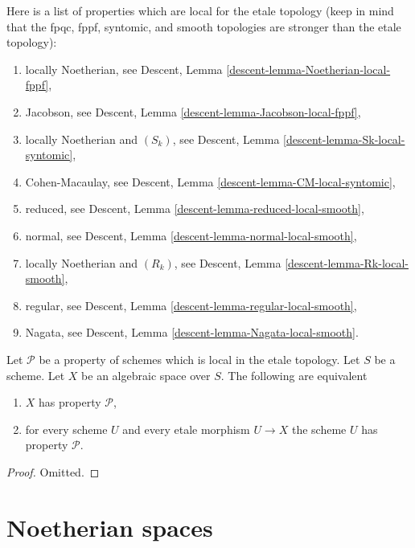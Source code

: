 \begin{remark}
\label{remark-list-properties-local-etale-topology}
Here is a list of properties which are local for the etale topology
(keep in mind that the fpqc, fppf, syntomic, and smooth topologies are
stronger than the etale topology):
\begin{enumerate}
\item locally Noetherian, see
Descent, Lemma \ref{descent-lemma-Noetherian-local-fppf},
\item Jacobson, see
Descent, Lemma \ref{descent-lemma-Jacobson-local-fppf},
\item locally Noetherian and $(S_k)$, see
Descent, Lemma \ref{descent-lemma-Sk-local-syntomic},
\item Cohen-Macaulay, see
Descent, Lemma \ref{descent-lemma-CM-local-syntomic},
\item reduced, see
Descent, Lemma \ref{descent-lemma-reduced-local-smooth},
\item normal, see
Descent, Lemma \ref{descent-lemma-normal-local-smooth},
\item locally Noetherian and $(R_k)$, see
Descent, Lemma \ref{descent-lemma-Rk-local-smooth},
\item regular, see
Descent, Lemma \ref{descent-lemma-regular-local-smooth},
\item Nagata, see
Descent, Lemma \ref{descent-lemma-Nagata-local-smooth}.
\end{enumerate}
\end{remark}

\begin{lemma}
\label{lemma-type-property}
Let $\mathcal{P}$ be a property of schemes which is 
local in the etale topology.
Let $S$ be a scheme.
Let $X$ be an algebraic space over $S$.
The following are equivalent
\begin{enumerate}
\item $X$ has property $\mathcal{P}$,
\item for every scheme $U$ and every etale morphism $U \to X$
the scheme $U$ has property $\mathcal{P}$.
\end{enumerate}
\end{lemma}

\begin{proof}
Omitted.
\end{proof}





\section{Noetherian spaces}
\label{section-noetherian}

